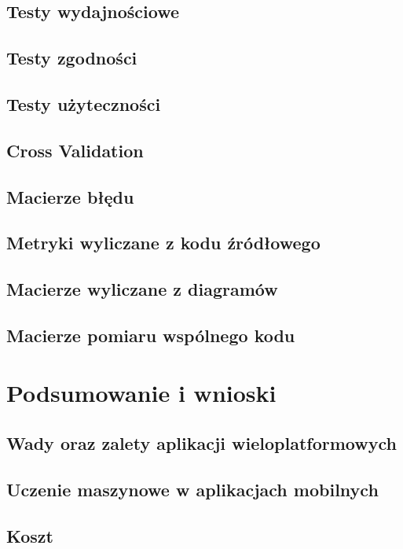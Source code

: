 \documentclass[brudnopis]{xmgr}
\begin{document}
\section{Testy wydajnościowe}

\section{Testy zgodności}

\section{Testy użyteczności}

\section{Cross Validation}

\section{Macierze błędu}

\section{Metryki wyliczane z kodu źródłowego}

\section{Macierze wyliczane z diagramów}

\section{Macierze pomiaru wspólnego kodu}

\chapter{Podsumowanie i wnioski}

\section{Wady oraz zalety aplikacji wieloplatformowych}

\section{Uczenie maszynowe w aplikacjach mobilnych}

\section{Koszt}

\summary




\oswiadczenie
\end{document}
